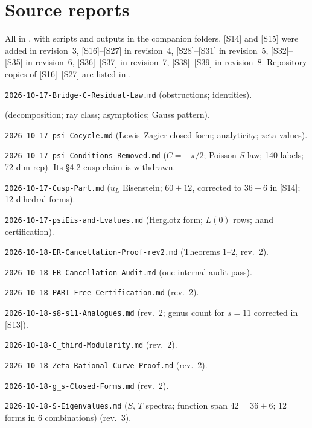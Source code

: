 \documentclass[11pt]{article}
\theoremstyle{definition}
\theoremstyle{plain}
\begin{document}
\section*{Source reports}\label{sec:sources}
All in , with scripts and outputs in the companion folders. [S14] and [S15] were added in revision~3,
[S16]--[S27] in revision~4, [S28]--[S31] in revision~5, [S32]--[S35] in revision~6, [S36]--[S37] in revision~7, [S38]--[S39] in revision~8. Repository copies of [S16]--[S27] are listed in .
\begin{enumerate}[label={[S\arabic*]},leftmargin=3em]
\item \texttt{2026-10-17-Bridge-C-Residual-Law.md} (obstructions; identities).
\item {} (decomposition; ray class; asymptotics; Gauss pattern).
\item \texttt{2026-10-17-psi-Cocycle.md} (Lewis--Zagier closed form; analyticity; zeta values).
\item \texttt{2026-10-17-psi-Conditions-Removed.md} ($C=-\pi/2$; Poisson $S$-law; 140 labels; 72-dim rep). Its \S4.2 cusp claim is withdrawn.
\item \texttt{2026-10-17-Cusp-Part.md} ($u_L$ Eisenstein; $60+12$, corrected to $36+6$ in [S14]; 12 dihedral forms).
\item \texttt{2026-10-17-psiEis-and-Lvalues.md} (Herglotz form; $L(0)$ rows; hand certification).
\item \texttt{2026-10-18-ER-Cancellation-Proof-rev2.md} (Theorems 1--2, rev.~2).
\item \texttt{2026-10-18-ER-Cancellation-Audit.md} (one internal audit pass).
\item \texttt{2026-10-18-PARI-Free-Certification.md} (rev.~2).
\item \texttt{2026-10-18-s8-s11-Analogues.md} (rev.~2; genus count for $s=11$ corrected in [S13]).
\item \texttt{2026-10-18-C\_third-Modularity.md} (rev.~2).
\item \texttt{2026-10-18-Zeta-Rational-Curve-Proof.md} (rev.~2).
\item \texttt{2026-10-18-g\_s-Closed-Forms.md} (rev.~2).
\item \texttt{2026-10-18-S-Eigenvalues.md} ($S$, $T$ spectra; function span $42=36+6$; $12$ forms in $6$ combinations) (rev.~3).

\end{enumerate}
\end{document}
